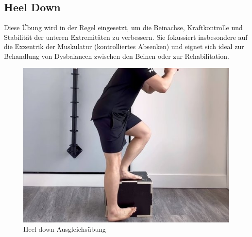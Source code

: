 
\subsection{Heel Down}

Diese Übung wird in der Regel eingesetzt, um die Beinachse, Kraftkontrolle und Stabilität der unteren Extremitäten zu verbessern. Sie fokussiert insbesondere auf die Exzentrik der Muskulatur (kontrolliertes Absenken) und eignet sich ideal zur Behandlung von Dysbalancen zwischen den Beinen oder zur Rehabilitation.

\begin{figure}[!]
    \centering
    \includegraphics[width=0.5\linewidth]{img/Heel-down-Uebung.jpg}
    \caption{Heel down Ausgleichsübung \cite{rehabhero}}
    \label{Heel-down-Ausgleichsübung}
\end{figure}

